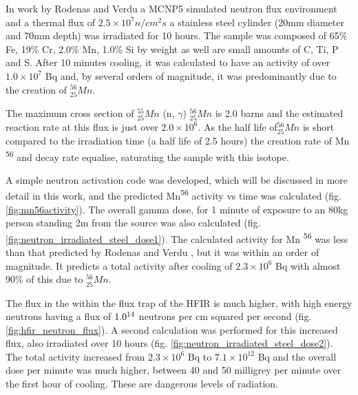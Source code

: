 In work by Rodenas and Verdu a MCNP5 simulated neutron flux environment and a thermal flux of $2.5 \times 10^7 n/cm^2 s$ a stainless steel cylinder (20mm diameter and 70mm depth) was irradiated for 10 hours\cite{radionuclides}.  The sample was composed of 65\% Fe, 19\% Cr, 2.0\% Mn, 1.0\% Si by weight as well are small amounts of C, Ti, P and S.  After 10 minutes cooling, it was calculated to have an activity of over $1.0 \times 10^7$ Bq and, by several orders of magnitude, it was predominantly due to the creation of ${}^{56}_{25}Mn$.  

The maximum cross section of ${}^{55}_{25}Mn$ (n, $\gamma$) ${}^{56}_{25}Mn$ is 2.0 barns and the estimated reaction rate at this flux is just over $2.0 \times 10^6$.  As the half life of${}^{56}_{25}Mn$ is short compared to the irradiation time (a half life of 2.5 hours) the creation rate of Mn \textsuperscript{56} and decay rate equalise, saturating the sample with this isotope.

A simple neutron activation code was developed, which will be discussed in more detail in this work, and the predicted Mn\textsuperscript{56} activity vs time was calculated (fig. \ref{fig:mn56activity}).  The overall gamma dose, for 1 minute of exposure to an 80kg person standing 2m from the source was also calculated (fig. \ref{fig:neutron_irradiated_steel_dose1}).  The calculated activity for Mn \textsuperscript{56} was less than that predicted by Rodenas and Verdu \cite{radionuclides}, but it was within an order of magnitude.  It predicts a total activity after cooling of $2.3\times10^6$ Bq with almost 90\% of this due to ${}^{56}_{25}Mn$.

The flux in the within the flux trap of the HFIR is much higher, with high energy neutrons having a flux of $1.0 \time 10^{14}$ neutrons per cm squared per second (fig. \ref{fig:hfir_neutron_flux}).  A second calculation was performed for this increased flux, also irradiated over 10 hours (fig. \ref{fig:neutron_irradiated_steel_dose2}).  The total activity increased from $2.3\times10^6$ Bq to $7.1\times10^{12}$ Bq and the overall dose per minute was much higher, between 40 and 50 milligrey per minute over the first hour of cooling.  These are dangerous levels of radiation.

